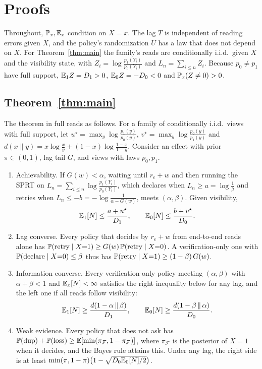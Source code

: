 \section{Proofs}
\label{app:proofs}

Throughout, $\mathbb{P}_x,\mathbb{E}_x$ condition on $X{=}x$. The lag $T$ is independent of reading errors given $X$, and the policy's randomization $U$ has a law that does not depend on $X$.
For Theorem~\ref{thm:main} the family's reads are conditionally i.i.d.\ given $X$ and the visibility state, with $Z_i=\log\frac{p_1(Y_i)}{p_0(Y_i)}$ and $L_n=\sum_{i\le n}Z_i$.
Because $p_0\ne p_1$ have full support, $\mathbb{E}_1Z=D_1>0$, $\mathbb{E}_0Z=-D_0<0$ and $\mathbb{P}_x(Z\ne0)>0$.

\subsection{Theorem~\ref{thm:main}}
The theorem in full reads as follows. For a family of conditionally i.i.d.\ views with full support, let $u^\star=\max_y\log\frac{p_1(y)}{p_0(y)}$, $v^\star=\max_y\log\frac{p_0(y)}{p_1(y)}$
and $d(x\|y)=x\log\frac{x}{y}+(1-x)\log\frac{1-x}{1-y}$. Consider an effect with prior $\pi\in(0,1)$, lag tail $G$, and views with laws $p_0,p_1$.
\begin{enumerate}[leftmargin=*,label=(\alph*),topsep=1pt,itemsep=1pt]
\item Achievability. If $G(w)<\alpha$, waiting until $r_e+w$ and then running the SPRT on $L_n=\sum_{i\le n}\log\frac{p_1(Y_i)}{p_0(Y_i)}$, which declares when
$L_n\ge a=\log\frac1\beta$ and retries when $L_n\le-b=-\log\frac{1}{\alpha-G(w)}$, meets $(\alpha,\beta)$. Given visibility,
\begin{equation}
\mathbb{E}_1[N]\le\frac{a+u^\star}{D_1},\qquad \mathbb{E}_0[N]\le\frac{b+v^\star}{D_0}.
\label{eq:ub}
\end{equation}
\item Lag converse. Every policy that decides by $r_e+w$ from end-to-end reads alone has $\mathbb{P}(\text{retry}\mid X{=}1)\ge G(w)\,\mathbb{P}(\text{retry}\mid X{=}0)$.
A verification-only one with $\mathbb{P}(\text{declare}\mid X{=}0)\le\beta$ thus has $\mathbb{P}(\text{retry}\mid X{=}1)\ge(1-\beta)\,G(w)$.
\item Information converse. Every verification-only policy meeting $(\alpha,\beta)$ with $\alpha+\beta<1$ and $\mathbb{E}_x[N]<\infty$ satisfies the right inequality
below for any lag, and the left one if all reads follow visibility:
\begin{equation}
\mathbb{E}_1[N]\ge\frac{d(1-\alpha\,\|\,\beta)}{D_1},\qquad \mathbb{E}_0[N]\ge\frac{d(1-\beta\,\|\,\alpha)}{D_0}.
\label{eq:lb}
\end{equation}
\item Weak evidence. Every policy that does not ask has $\mathbb{P}(\mathrm{dup})+\mathbb{P}(\mathrm{loss})\ge\mathbb{E}[\min(\pi_{\mathcal F},1-\pi_{\mathcal F})]$, where $\pi_{\mathcal F}$ is the posterior
of $X{=}1$ when it decides, and the Bayes rule attains this. Under any lag, the right side is at least $\min(\pi,1-\pi)\big(1-\sqrt{D_0\mathbb{E}_0[N]/2}\big)$.
\end{enumerate}
